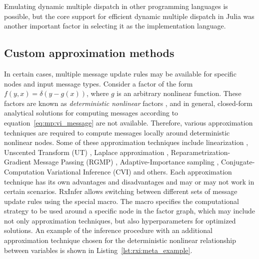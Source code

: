Emulating dynamic multiple dispatch in other programming languages is possible, but the core support for efficient dynamic multiple dispatch in Julia was another important factor in selecting it as the implementation language.

\subsection{Custom approximation methods}

In certain cases, multiple message update rules may be available for specific nodes and
input message types.
Consider a factor of the form $f(y, x) = \delta(y - g(x))$, where $g$ is an arbitrary nonlinear
function.
These factors are known as \textit{deterministic nonlinear} factors \citep{senoz_thesis}, and
in general, closed-form analytical solutions for computing messages according to
equation~\eqref{eq:mp:vi_message} are not available.
Therefore, various approximation techniques are required to compute messages locally around
deterministic nonlinear nodes.
Some of these approximation techniques include linearization \citep{sarkka_bayesian_2013},
Unscented Transform (UT) \citep{sarkka_bayesian_2013}, Laplace approximation
\citep{akbayrak_extended_2021}, Reparametrization-Gradient Message Passing (RGMP)
\citep{akbayrak_reparameterization_2019}, Adaptive-Importance sampling 
\citep{akbayrak_adaptive_2022}, Conjugate-Computation Variational Inference (CVI)
\citep{khan_conjugate-computation_2017, akbayrak_probabilistic_2022} and others.
Each approximation technique has its own advantages and disadvantages and may or may not work
in certain scenarios.
RxInfer allows switching between different sets of message update rules using the special
 macro.
The  macro specifies the computational strategy to be used around a specific node
in the factor graph, which may include not only approximation techniques, but also
hyperparameters for optimized solutions.
An example of the inference procedure with an additional approximation technique chosen for the
deterministic nonlinear relationship between variables is shown in
Listing~\ref{lst:rxi:meta_example}.

\begin{figure*}[h!]
  \begin{adjustbox}{minipage=\textwidth,margin=0pt \smallskipamount,center}
  \end{adjustbox}
\end{figure*}


